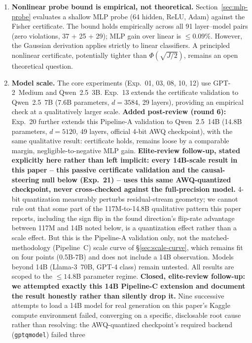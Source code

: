 \documentclass[onecolumn]{jmlr}
\begin{document}
\begin{enumerate}[leftmargin=*, topsep=2pt, itemsep=2pt]
\item \textbf{Nonlinear probe bound is empirical, not theoretical.}
  Section~\ref{sec:mlp-probe} evaluates a shallow MLP probe (64 hidden,
  ReLU, Adam) against the Fisher certificate. The bound holds
  empirically across all 91 layer--model pairs (zero violations, 37 +
  25 + 29); MLP gain over linear is $\leq 0.09\%$. However, the
  Gaussian derivation applies strictly to linear classifiers. A
  principled nonlinear certificate, potentially tighter than
  $\Phi(\sqrt{J/2})$, remains an open theoretical question.

\item \textbf{Model scale.} The core experiments (Exp.~01, 03, 08, 10,
  12) use GPT-2~Medium and Qwen~2.5~3B. Exp.~13 extends the certificate
  validation to Qwen~2.5~7B (7.6B parameters, $d=3584$, 29 layers),
  providing an empirical check at a qualitatively larger scale.
  \textbf{Added post-review (round 6):} Exp.~20 further extends this
  Pipeline-A validation to Qwen~2.5~14B (14.8B parameters, $d=5120$, 49
  layers, official 4-bit AWQ checkpoint), with the same qualitative
  result: certificate holds, remains loose by a comparable margin,
  negligible-to-negative MLP gain. \textbf{Elite-review follow-up,
  stated explicitly here rather than left implicit: every 14B-scale
  result in this paper -- this passive certificate validation and the
  causal-steering null below (Exp.~21) -- uses this same AWQ-quantized
  checkpoint, never cross-checked against the full-precision model.}
  4-bit quantization measurably perturbs residual-stream geometry; we
  cannot rule out that some part of the 117M-to-14.8B qualitative
  pattern this paper reports, including the sign flip in the found
  direction's flip-rate advantage between 117M and 14B noted below, is
  a quantization effect rather than a scale effect. But this is the
  Pipeline-A
  validation only, not the matched-methodology (Pipeline~C) scale curve
  of \S\ref{sec:scale-curve}, which remains fit on four points
  (0.5B-7B) and does not include a 14B observation. Models beyond 14B
  (Llama-3~70B, GPT-4 class) remain untested. All results are scoped to
  the $\leq 14.8$B parameter regime. \textbf{Closed, elite-review
  follow-up: we attempted exactly this 14B Pipeline-C extension and
  document the result honestly rather than silently drop it.} Nine
  successive attempts to load a 14B model for real generation on this
  paper's Kaggle compute environment failed, converging on a specific,
  disclosable root cause rather than resolving: the AWQ-quantized
  checkpoint's required backend (\texttt{gptqmodel}) failed three

\end{enumerate}
\end{document}
